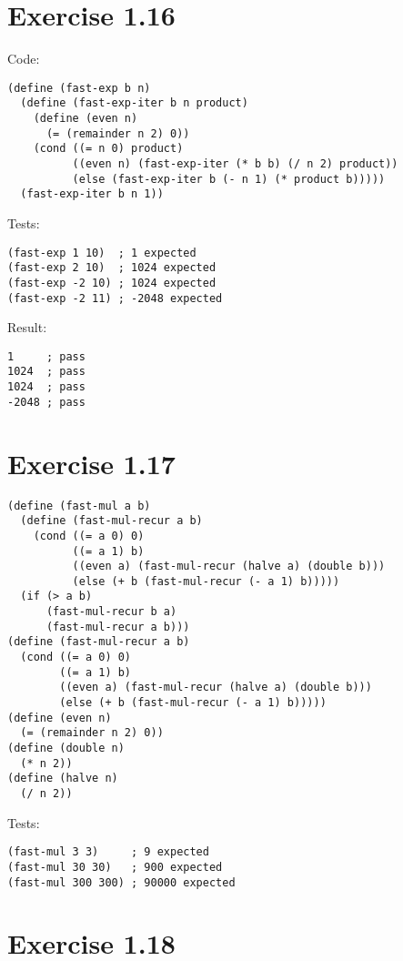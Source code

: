 \documentclass[../main.tex]{subfiles}
\begin{document}
\section{Exercise 1.16}

Code:

\begin{lstlisting}
(define (fast-exp b n)
  (define (fast-exp-iter b n product)
    (define (even n)
      (= (remainder n 2) 0))
    (cond ((= n 0) product)
          ((even n) (fast-exp-iter (* b b) (/ n 2) product))
          (else (fast-exp-iter b (- n 1) (* product b)))))
  (fast-exp-iter b n 1))
\end{lstlisting}

Tests:

\begin{lstlisting}
(fast-exp 1 10)  ; 1 expected
(fast-exp 2 10)  ; 1024 expected
(fast-exp -2 10) ; 1024 expected
(fast-exp -2 11) ; -2048 expected
\end{lstlisting}

Result:

\begin{lstlisting}
1     ; pass
1024  ; pass
1024  ; pass
-2048 ; pass
\end{lstlisting}

\section{Exercise 1.17}

\begin{lstlisting}
(define (fast-mul a b)
  (define (fast-mul-recur a b)
    (cond ((= a 0) 0)
          ((= a 1) b)
          ((even a) (fast-mul-recur (halve a) (double b)))
          (else (+ b (fast-mul-recur (- a 1) b)))))
  (if (> a b)
      (fast-mul-recur b a)
      (fast-mul-recur a b)))
(define (fast-mul-recur a b)
  (cond ((= a 0) 0)
        ((= a 1) b)
        ((even a) (fast-mul-recur (halve a) (double b)))
        (else (+ b (fast-mul-recur (- a 1) b)))))
(define (even n)
  (= (remainder n 2) 0))
(define (double n)
  (* n 2))
(define (halve n)
  (/ n 2))
\end{lstlisting}

Tests:

\begin{lstlisting}
(fast-mul 3 3)     ; 9 expected
(fast-mul 30 30)   ; 900 expected
(fast-mul 300 300) ; 90000 expected
\end{lstlisting}

\section{Exercise 1.18}
\end{document}
